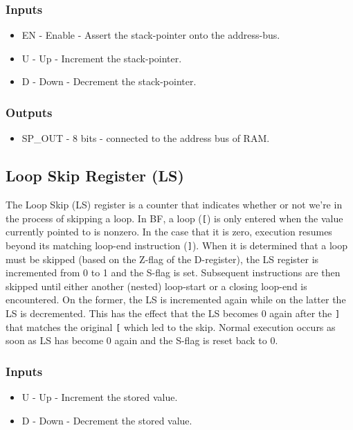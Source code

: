 \subsubsection*{Inputs}
\begin{itemize}
\itemsep0em 
\item EN - Enable - Assert the stack-pointer onto the address-bus.
\item U - Up - Increment the stack-pointer.
\item D - Down - Decrement the stack-pointer.
\end{itemize}

\subsubsection*{Outputs}
\begin{itemize}
\itemsep0em 
\item SP\_OUT - 8 bits - connected to the address bus of RAM.
\end{itemize}

\subsection{Loop Skip Register (LS)} \label{sec:architecture:ls}
The Loop Skip (LS) register is a counter that indicates whether or not we're in the process of skipping a loop. In BF, a loop (\texttt{[}) is only entered when the value currently pointed to is nonzero. In the case that it is zero, execution resumes beyond its matching loop-end instruction (\texttt{]}). When it is determined that a loop must be skipped (based on the Z-flag of the D-register), the LS register is incremented from 0 to 1 and the S-flag is set. Subsequent instructions are then skipped until either another (nested) loop-start or a closing loop-end is encountered. On the former, the LS is incremented again while on the latter the LS is decremented. This has the effect that the LS becomes 0 again after the \texttt{]} that matches the original \texttt{[} which led to the skip. Normal execution occurs as soon as LS has become 0 again and the S-flag is reset back to 0.

\subsubsection*{Inputs}
\begin{itemize}
  \itemsep0em
\item U - Up - Increment the stored value.
\item D - Down - Decrement the stored value.
\end{itemize}

